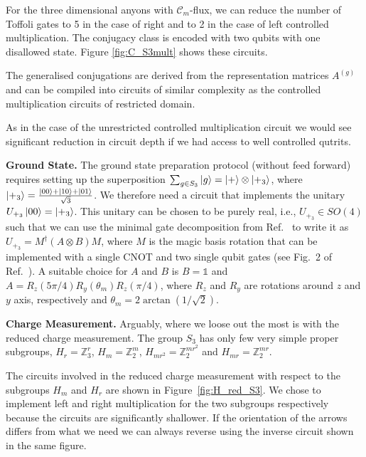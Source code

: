 \documentclass[two column]{article}
\begin{document}
For the three dimensional anyons with $\mathcal{C}_m$-flux, we can reduce the number of Toffoli gates to 5 in the case of right and to 2 in the case of left controlled multiplication. The conjugacy class is encoded with two qubits with one disallowed state. Figure \ref{fig:C_S3mult} shows these circuits.

The generalised conjugations are derived from the representation matrices $A^{(g)}$ and can be compiled into circuits of similar complexity as the controlled multiplication circuits of restricted domain.

As in the case of the unrestricted controlled multiplication circuit we would see significant reduction in circuit depth if we had access to well controlled qutrits.

\textbf{Ground State.}
The ground state preparation protocol (without feed forward) requires setting up the superposition $\sum_{g \in S_3} \ket{g}=\ket{+}\otimes \ket{+_3}$, where $\ket{+_3}=\frac{\ket{00}+\ket{10}+\ket{01}}{{\sqrt{3}} }$. We therefore need a circuit that implements the unitary $U_{+_3}\ket{00}= \ket{+_3}$. This unitary can be chosen to be purely real, i.e., $U_{+_3}\in SO(4)$ such that we can use the minimal gate decomposition from Ref.~\cite{decomp} to write it as $U_{+_3}=M^\dag(A\otimes B)M$, where $M$ is the magic basis rotation that can be implemented with a single CNOT and two single qubit gates  (see Fig.~2 of Ref.~\cite{decomp}). A suitable choice for $A$ and $B$ is $B=\mathbb 1$ and $A=R_z(5\pi/4)R_y(\theta_m) R_z(\pi/4)$, where $R_z$ and $R_y$ are rotations around $z$ and $y$ axis, respectively and $\theta_m=2 \arctan(1/\sqrt{2})$. 

\textbf{Charge Measurement.}
Arguably, where we loose out the most is with the reduced charge measurement. The group $S_3$ has only few very simple proper subgroups, $H_r = \mathbb{Z}_3^r$, $H_m = \mathbb{Z}_2^m$, $H_{mr^2} = \mathbb{Z}_2^{mr^2}$ and $H_{mr} = \mathbb{Z}_2^{mr}$.

The circuits involved in the reduced charge measurement with respect to the subgroups $H_m$ and $H_r$ are shown in Figure~\ref{fig:H_red_S3}. We chose to implement left and right multiplication for the two subgroups respectively because the circuits are significantly shallower. If the orientation of the arrows differs from what we need we can always reverse using the inverse circuit shown in the same figure.
\end{document}
